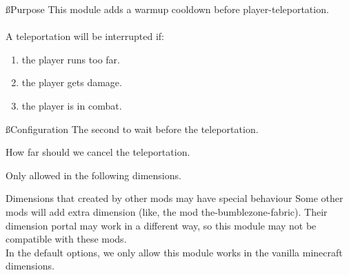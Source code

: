 
\ss{Purpose}
This module adds a warmup cooldown before player-teleportation.\\
\\
A teleportation will be interrupted if:
\begin{enumerate}
    \item the player runs too far.
    \item the player gets damage.
    \item the player is in combat.
\end{enumerate}

\ss{Configuration}
The second to wait before the teleportation.

How far should we cancel the teleportation.

Only allowed in the following dimensions.

\begin{warn}{Dimensions that created by other mods may have special behaviour}
    Some other mods will add extra dimension (like, the mod the-bumblezone-fabric).
    Their dimension portal may work in a different way, so this module may not be compatible with these mods.\\
    In the default options, we only allow this module works in the vanilla minecraft dimensions.
\end{warn}
